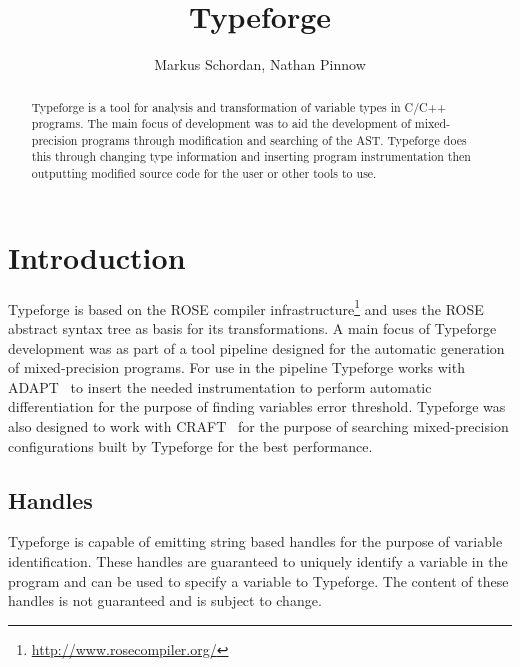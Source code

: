 \documentclass[natbib]{article}
\begin{document}
\title{Typeforge}

\author{\small Markus Schordan, Nathan Pinnow}

\maketitle

\begin{abstract}
\noindent Typeforge is a tool for analysis and transformation of variable types in 
C/C++ programs. The main focus of development was to aid the development of 
mixed-precision programs through modification and searching of the AST. 
Typeforge does this through changing type information and inserting program 
instrumentation then outputting modified source code for the user or other tools to use.

\end{abstract}

\tableofcontents


\section{Introduction}
\label{sec:intro}

Typeforge is based on the ROSE compiler infrastructure\footnote{\url{http://www.rosecompiler.org/}} 
and uses the ROSE abstract syntax tree as basis for its transformations. 
A main focus of Typeforge development was as part of a tool pipeline designed for 
the automatic generation of mixed-precision programs. For use in the pipeline 
Typeforge works with ADAPT~\cite{adapt} to insert the needed instrumentation to 
perform automatic differentiation for the purpose of finding variables error threshold.
Typeforge was also designed to work with CRAFT~\cite{CRAFT2013PARCO,CRAFT2013ICS,CRAFT2016} 
for the purpose of searching mixed-precision configurations built by Typeforge 
for the best performance.

\subsection{Handles}
Typeforge is capable of emitting string based handles for the purpose of variable identification. 
These handles are guaranteed to uniquely identify a variable in the program and can be used to 
specify a variable to Typeforge. The content of these handles is not guaranteed and is 
subject to change.
\end{document}

